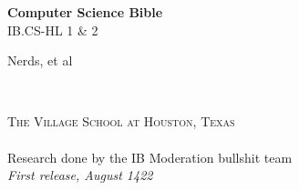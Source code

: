 \documentclass[12pt,fleqn]{book} %
\begin{document}

\begingroup
\thispagestyle{empty}
\centering
\vspace*{5cm}
\par\normalfont\fontsize{35}{35}\sffamily\selectfont
\textbf{Computer Science Bible}\\
{\LARGE IB.CS-HL 1 \& 2}\par %
\vspace*{1cm}
{\Huge Nerds, et al}\par %
\endgroup


\newpage
~\vfill
\thispagestyle{empty}


\noindent \textsc{The Village School at Houston, Texas}\\

\\ %

\noindent Research done by the IB Moderation bullshit team \\ %

\noindent \textit{First release, August 1422} %


\pagestyle{empty} %

\tableofcontents %


\pagestyle{fancy} %

\end{document}
